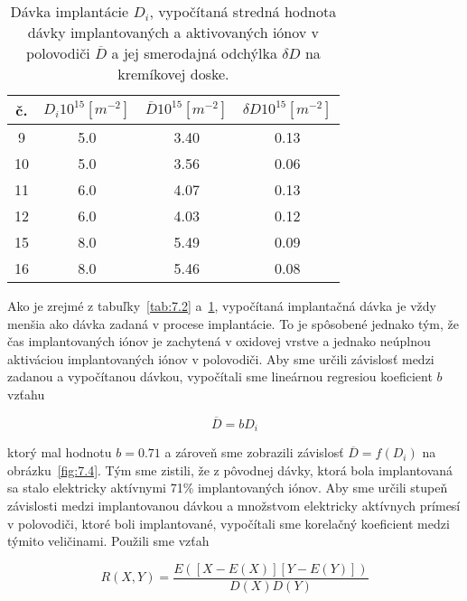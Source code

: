 \begin{table}[h!]\centering
  \begin{minipage}[c]{\myfiguresize}
    \begin{center}
      \begin{tabular}{c c c c}
        \hline
        č. & $D_{i} 10^{15} [m^{-2}]$ & $\overline D 10^{15} [m^{-2}]$ & $\delta D 10^{15} [m^{-2}]$\\
        \hline
         9 & 5.0 & 3.40 & 0.13\\
        10 & 5.0 & 3.56 & 0.06\\
        11 & 6.0 & 4.07 & 0.13\\
        12 & 6.0 & 4.03 & 0.12\\
        15 & 8.0 & 5.49 & 0.09\\
        16 & 8.0 & 5.46 & 0.08\\
        \hline
      \end{tabular}
    \end{center}
    \caption[Dávka implantácie $D_{i}$]{Dávka implantácie $D_{i}$,
      vypočítaná stredná hodnota dávky implantovaných a aktivovaných
      iónov v polovodiči $\overline D$ a jej smerodajná odchýlka
      $\delta D$ na kremíkovej doske.}\label{tab:7.3}
  \end{minipage}
\end{table}

Ako je zrejmé z tabuľky~\ref{tab:7.2} a~\ref{tab:7.3}, vypočítaná
implantačná dávka je vždy menšia ako dávka zadaná v procese
implantácie. To je spôsobené jednako tým, že čas implantovaných iónov
je zachytená v oxidovej vrstve a jednako neúplnou aktiváciou
implantovaných iónov v polovodiči. Aby sme určili závislosť medzi
zadanou a vypočítanou dávkou, vypočítali sme lineárnou regresiou
koeficient $b$ vzťahu

\begin{equation}\label{eq:7.1}
  \overline D = bD_{i}
\end{equation}

ktorý mal hodnotu $b = 0.71$ a zároveň sme zobrazili závislosť
$\overline D = f(D_{i})$ na obrázku~\ref{fig:7.4}. Tým sme zistili, že
z pôvodnej dávky, ktorá bola implantovaná sa stalo elektricky
aktívnymi 71\% implantovaných iónov. Aby sme určili stupeň závislosti
medzi implantovanou dávkou a množstvom elektricky aktívnych prímesí v
polovodiči, ktoré boli implantované, vypočítali sme korelačný
koeficient medzi týmito veličinami. Použili sme vzťah

\begin{equation}\label{eq:7.2}
  R(X,Y) = \frac{E([X-E(X)][Y-E(Y)])}{D(X)D(Y)}
\end{equation}

